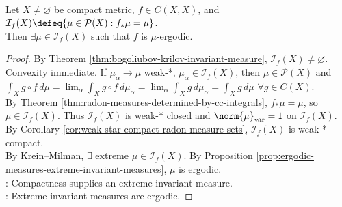 \begin{corollary} \label{cor:compact-map-ergodic-invariant-measure} \\
Let $X\ne\varnothing$ be compact metric, $f\in C(X,X)$, and $\mathcal{I}_f(X)\defeq\{\mu\in\mathcal{P}(X):f_*\mu=\mu\}$.\\
Then $\exists\mu\in\mathcal{I}_f(X)$ such that $f$ is $\mu$-ergodic.
\begin{proof} By Theorem \ref{thm:bogoliubov-krilov-invariant-measure}, $\mathcal{I}_f(X)\ne\varnothing$. Convexity immediate. If $\mu_\alpha\to\mu$ weak-*, $\mu_\alpha\in\mathcal{I}_f(X)$, then $\mu\in\mathcal{P}(X)$ and $\int_X g\circ f\,d\mu=\lim_\alpha\int_X g\circ f\,d\mu_\alpha=\lim_\alpha\int_X g\,d\mu_\alpha=\int_X g\,d\mu$ $\forall g\in C(X)$.\\
By Theorem \ref{thm:radon-measures-determined-by-cc-integrals}, $f_*\mu=\mu$, so $\mu\in\mathcal{I}_f(X)$. Thus $\mathcal{I}_f(X)$ is weak-* closed and $\norm{\mu}_{\mathrm{var}}=1$ on $\mathcal{I}_f(X)$.\\
By Corollary \ref{cor:weak-star-compact-radon-measure-sets}, $\mathcal{I}_f(X)$ is weak-* compact.\\
By Krein--Milman, $\exists$ extreme $\mu\in\mathcal{I}_f(X)$. By Proposition \ref{prop:ergodic-measures-extreme-invariant-measures}, $\mu$ is ergodic.\\
: Compactness supplies an extreme invariant measure.\\
: Extreme invariant measures are ergodic.
\end{proof}
\end{corollary}

